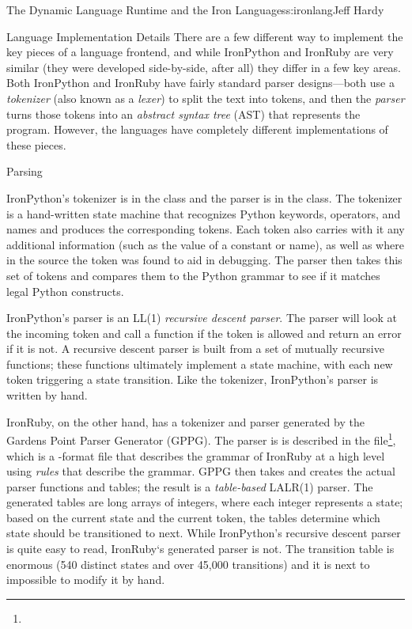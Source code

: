 \begin{aosachapter}{The Dynamic Language Runtime and the Iron Languages}{s:ironlang}{Jeff Hardy}
\begin{aosasect1}{Language Implementation Details}
There are a few different way to implement the key pieces of a language frontend, and while IronPython and IronRuby are very similar (they were developed side-by-side, after all) they differ in a few key areas. Both IronPython and IronRuby have fairly standard parser designs---both use a \emph{tokenizer} (also known as a \emph{lexer}) to split the text into tokens, and then the \emph{parser} turns those tokens into an \emph{abstract syntax tree} (AST) that represents the program. However, the languages have completely different implementations of these pieces.

\end{aosasect1}

\begin{aosasect1}{Parsing}

IronPython's tokenizer is in the  class and the parser is in the  class. The tokenizer is a hand-written state machine that recognizes Python keywords, operators, and names and produces the corresponding tokens. Each token also carries with it any additional information (such as the value of a constant or name), as well as where in the source the token was found to aid in debugging. The parser then takes this set of tokens and compares them to the Python grammar to see if it matches legal Python constructs.

IronPython's parser is an LL(1) \emph{recursive descent parser}. The parser will look at the incoming token and call a function if the token is allowed and return an error if it is not. A recursive descent parser is built from a set of mutually recursive functions; these functions ultimately implement a state machine, with each new token triggering a state transition. Like the tokenizer, IronPython's parser is written by hand.

IronRuby, on the other hand, has a tokenizer and parser generated by the Gardens Point Parser Generator (GPPG). The parser is is described in the  file\footnote{}, which is a -format file that describes the grammar of IronRuby at a high level using \emph{rules} that describe the grammar. GPPG then takes  and creates the actual parser functions and tables; the result is a \emph{table-based} LALR(1) parser. The generated tables are long arrays of integers, where each integer represents a state; based on the current state and the current token, the tables determine which state should be transitioned to next. While IronPython's recursive descent parser is quite easy to read, IronRuby`s generated parser is not. The transition table is enormous (540 distinct states and over 45,000 transitions) and it is next to impossible to modify it by hand.


\end{aosasect1}
\end{aosachapter}
